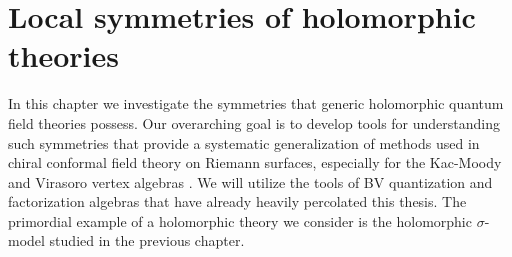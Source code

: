 %
%
%
%
%
%
%
%
%
%
%

\chapter{Local symmetries of holomorphic theories}\label{chap: symmetries}


In this chapter we investigate the symmetries that generic holomorphic quantum field theories possess.
Our overarching goal is to develop tools for understanding such symmetries that provide a systematic generalization of methods used in chiral conformal field theory on Riemann surfaces, especially for the Kac-Moody and Virasoro vertex algebras \cite{IgorKM, KacVertex, BorcherdsVertex}. 
We will utilize the tools of BV quantization and factorization algebras that have already heavily percolated this thesis.
The primordial example of a holomorphic theory we consider is the holomorphic $\sigma$-model studied in the previous chapter. 


